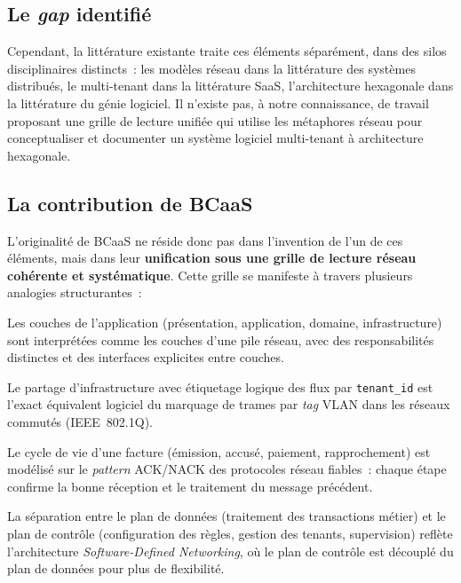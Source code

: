 \subsection{Le \textit{gap} identifié}
\label{subsec:gap}

Cependant, la littérature existante traite ces éléments séparément, dans des silos
disciplinaires distincts~: les modèles réseau dans la littérature des systèmes distribués,
le multi-tenant dans la littérature SaaS, l'architecture hexagonale dans la littérature du
génie logiciel. Il n'existe pas, à notre connaissance, de travail proposant une grille de
lecture unifiée qui utilise les métaphores réseau pour conceptualiser et documenter un
système logiciel multi-tenant à architecture hexagonale.

\subsection{La contribution de BCaaS}
\label{subsec:contribution}

L'originalité de BCaaS ne réside donc pas dans l'invention de l'un de ces éléments, mais
dans leur \textbf{unification sous une grille de lecture réseau cohérente et systématique}.
Cette grille se manifeste à travers plusieurs analogies structurantes~:

\begin{description}[leftmargin=0.5cm]
  \item[\textbf{La pile métier comme pile protocolaire}]
    Les couches de l'application (présentation, application, domaine, infrastructure) sont
    interprétées comme les couches d'une pile réseau, avec des responsabilités distinctes
    et des interfaces explicites entre couches.

  \item[\textbf{L'isolation multi-tenant comme VLAN}]
    Le partage d'infrastructure avec étiquetage logique des flux par \texttt{tenant\_id}
    est l'exact équivalent logiciel du marquage de trames par \textit{tag} VLAN dans les
    réseaux commutés (IEEE~802.1Q).

  \item[\textbf{La facture comme accusé de réception}]
    Le cycle de vie d'une facture (émission, accusé, paiement, rapprochement) est modélisé
    sur le \textit{pattern} ACK/NACK des protocoles réseau fiables~: chaque étape confirme
    la bonne réception et le traitement du message précédent.

  \item[\textbf{L'administration comme plan de contrôle SDN}]
    La séparation entre le plan de données (traitement des transactions métier) et le plan
    de contrôle (configuration des règles, gestion des tenants, supervision) reflète
    l'architecture \textit{Software-Defined Networking}, où le plan de contrôle est
    découplé du plan de données pour plus de flexibilité.
\end{description}

